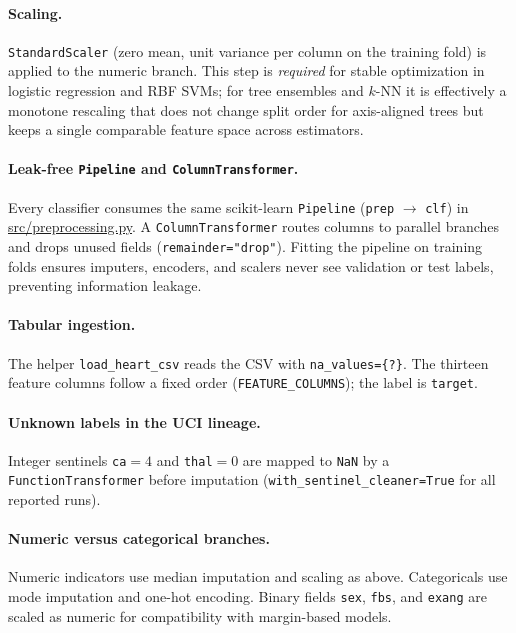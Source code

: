 \documentclass[11pt,a4paper]{article}
\begin{document}
\paragraph{Scaling.}
\texttt{StandardScaler} (zero mean, unit variance per column on the training fold) is applied to the numeric branch. This step is \emph{required} for stable optimization in logistic regression and RBF SVMs; for tree ensembles and $k$-NN it is effectively a monotone rescaling that does not change split order for axis-aligned trees but keeps a single comparable feature space across estimators.

\paragraph{Leak-free \texttt{Pipeline} and \texttt{ColumnTransformer}.}
Every classifier consumes the same scikit-learn \texttt{Pipeline} (\texttt{prep} $\rightarrow$ \texttt{clf}) in \url{src/preprocessing.py}. A \texttt{ColumnTransformer} routes columns to parallel branches and drops unused fields (\texttt{remainder="drop"}). Fitting the pipeline on training folds ensures imputers, encoders, and scalers never see validation or test labels, preventing information leakage.

\paragraph{Tabular ingestion.}
The helper \texttt{load\_heart\_csv} reads the CSV with \texttt{na\_values=\{?\}}. The thirteen feature columns follow a fixed order (\texttt{FEATURE\_COLUMNS}); the label is \texttt{target}.

\paragraph{Unknown labels in the UCI lineage.}
Integer sentinels \texttt{ca}${}=4$ and \texttt{thal}${}=0$ are mapped to \texttt{NaN} by a \texttt{FunctionTransformer} before imputation (\texttt{with\_sentinel\_cleaner=True} for all reported runs).

\paragraph{Numeric versus categorical branches.}
Numeric indicators use median imputation and scaling as above. Categoricals use mode imputation and one-hot encoding. Binary fields \texttt{sex}, \texttt{fbs}, and \texttt{exang} are scaled as numeric for compatibility with margin-based models.
\end{document}
